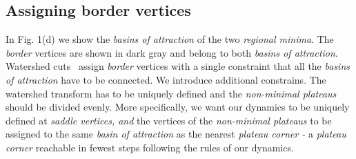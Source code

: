 \documentclass[10pt, conference, compsocconf]{IEEEtran}
\begin{document}
\subsection{Assigning border vertices}

In Fig. 1(d) we show the \emph{basins of attraction} of the two
\emph{regional minima}. The \emph{border} vertices are shown in dark
gray and belong to both \emph{basins of attraction}. Watershed
cuts~\cite{Cousty2009,Cousty2010} assign \emph{border} vertices with a
single constraint that all the \emph{basins of attraction} have to be
connected. We introduce additional constrains. The watershed transform
has to be uniquely defined and the \emph{non-minimal plateaus} should
be divided evenly. More specifically, we want our dynamics to be
uniquely defined at \emph{saddle vertices, and }the vertices of the
\emph{non-minimal plateaus} to be assigned to the same \emph{basin of
  attraction} as the nearest \emph{plateau corner - }a \emph{plateau
  corner} reachable in fewest steps following the rules of our
dynamics.
\end{document}

